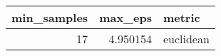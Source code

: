 \begin{tabular}{rrl}
\toprule
min_samples & max_eps & metric \\
\midrule
17 & 4.950154 & euclidean \\
\bottomrule
\end{tabular}
